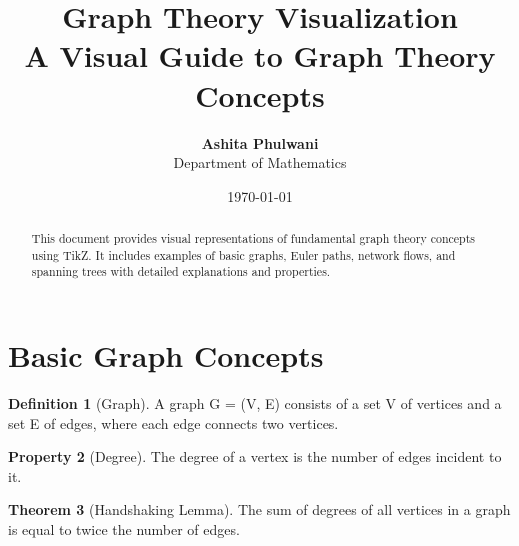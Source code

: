 \documentclass[12pt,a4paper]{article}
\title{\Large\textbf{Graph Theory Visualization}\\[0.5em]
       \normalsize A Visual Guide to Graph Theory Concepts}
\author{\textbf{Ashita Phulwani}\\
        Department of Mathematics}
\date{\today}
\theoremstyle{definition}
\newtheorem{definition}{Definition}[section]
\newtheorem{theorem}[definition]{Theorem}
\newtheorem{property}[definition]{Property}
\begin{document}
\maketitle

\begin{tcolorbox}[theorembox]
\begin{abstract}
This document provides visual representations of fundamental graph theory concepts using TikZ. It includes examples of basic graphs, Euler paths, network flows, and spanning trees with detailed explanations and properties.
\end{abstract}
\end{tcolorbox}

\tableofcontents
\newpage

\section{Basic Graph Concepts}

\begin{definition}[Graph]
A graph G = (V, E) consists of a set V of vertices and a set E of edges, where each edge connects two vertices.
\end{definition}

\begin{property}[Degree]
The degree of a vertex is the number of edges incident to it.
\end{property}

\begin{center}
\end{center}

\begin{theorem}[Handshaking Lemma]
The sum of degrees of all vertices in a graph is equal to twice the number of edges.
\end{theorem}
\end{document}
